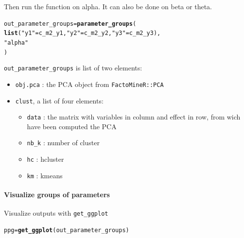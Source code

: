 \documentclass{book}\usepackage[]{graphicx}\usepackage[]{color}
\makeatletter
\newcommand{\hlstr}[1]{\textcolor[rgb]{0.192,0.494,0.8}{#1}}%
\newcommand{\hlstd}[1]{\textcolor[rgb]{0.345,0.345,0.345}{#1}}%
\newcommand{\hlkwb}[1]{\textcolor[rgb]{0.69,0.353,0.396}{#1}}%
\newcommand{\hlkwd}[1]{\textcolor[rgb]{0.737,0.353,0.396}{\textbf{#1}}}%
\newenvironment{kframe}{%
 \def\at@end@of@kframe{}%
 \ifinner\ifhmode%
  \def\at@end@of@kframe{\end{minipage}}%
  \begin{minipage}{\columnwidth}%
 \fi\fi%
 \def\FrameCommand##1{\hskip\@totalleftmargin \hskip-\fboxsep
 \colorbox{shadecolor}{##1}\hskip-\fboxsep
     \hskip-\linewidth \hskip-\@totalleftmargin \hskip\columnwidth}%
 \MakeFramed {\advance\hsize-\width
   \@totalleftmargin\z@ \linewidth\hsize
   \@setminipage}}%
 {\par\unskip\endMakeFramed%
 \at@end@of@kframe}
\newenvironment{knitrout}{}{} %
\makeatother
\begin{document}
Then run the function on alpha. 
It can also be done on beta or theta.

\begin{knitrout}
\color{fgcolor}\begin{kframe}
\begin{alltt}
\hlstd{out_parameter_groups} \hlkwb{=} \hlkwd{parameter_groups}\hlstd{(}
  \hlkwd{list}\hlstd{(}\hlstr{"y1"} \hlstd{= c_m2_y1,} \hlstr{"y2"} \hlstd{= c_m2_y2,} \hlstr{"y3"} \hlstd{= c_m2_y3),}
  \hlstr{"alpha"}
  \hlstd{)}
\end{alltt}


{\ttfamily\noindent\bfseries\color{errorcolor}{\#\# Error in parameter\_groups(list(y1 = c\_m2\_y1, y2 = c\_m2\_y2, y3 = c\_m2\_y3), : objet 'c\_m2\_y1' introuvable}}\end{kframe}
\end{knitrout}

\texttt{out\_parameter\_groups} is list of two elements:

\begin{itemize}
\item\texttt{obj.pca} : the PCA object from \texttt{FactoMineR::PCA}
\item \texttt{clust}, a list of four elements:
\begin{itemize}
  \item \texttt{data} : the matrix with variables in column and effect in row, from wich have been computed the PCA
  \item \texttt{nb\_k} : number of cluster
  \item \texttt{hc} : hcluster
  \item \texttt{km} : kmeans
  \end{itemize}
\end{itemize}

\paragraph{Visualize groups of parameters}

Visualize outputs with \texttt{get\_ggplot}

\begin{knitrout}
\color{fgcolor}\begin{kframe}
\begin{alltt}
\hlstd{ppg} \hlkwb{=} \hlkwd{get_ggplot}\hlstd{(out_parameter_groups)}
\end{alltt}
\end{kframe}
\end{knitrout}
\end{document}
